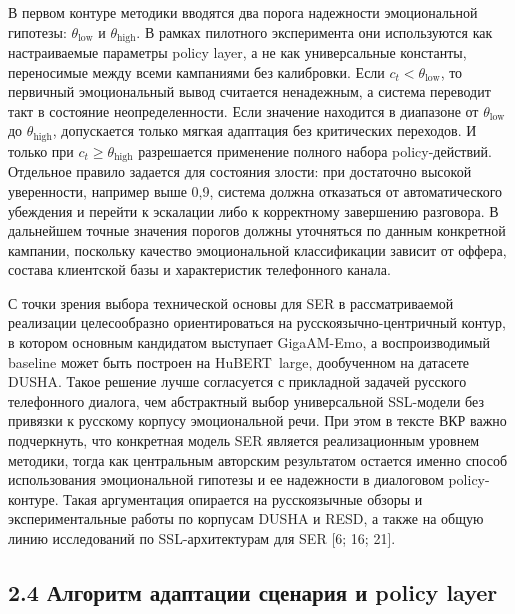 \documentclass[a4paper,14pt]{extarticle}
\renewcommand{\texttt}[1]{\textnormal{#1}}
\begin{document}
В первом контуре методики вводятся два порога надежности эмоциональной
гипотезы: \(\theta_{\mathrm{low}}\) и \(\theta_{\mathrm{high}}\). В
рамках пилотного эксперимента они используются как настраиваемые
параметры policy layer, а не как универсальные константы, переносимые
между всеми кампаниями без калибровки. Если
\(c_t < \theta_{\mathrm{low}}\), то первичный эмоциональный вывод
считается ненадежным, а система переводит такт в состояние
неопределенности. Если значение находится в диапазоне от
\(\theta_{\mathrm{low}}\) до \(\theta_{\mathrm{high}}\), допускается
только мягкая адаптация без критических переходов. И только при
\(c_t \ge \theta_{\mathrm{high}}\) разрешается применение полного набора
policy-действий. Отдельное правило задается для состояния злости: при
достаточно высокой уверенности, например выше 0,9, система должна
отказаться от автоматического убеждения и перейти к эскалации либо к
корректному завершению разговора. В дальнейшем точные значения порогов
должны уточняться по данным конкретной кампании, поскольку качество
эмоциональной классификации зависит от оффера, состава клиентской базы и
характеристик телефонного канала.

С точки зрения выбора технической основы для \texttt{SER} в
рассматриваемой реализации целесообразно ориентироваться на
русскоязычно-центричный контур, в котором основным кандидатом выступает
\texttt{GigaAM-Emo}, а воспроизводимый baseline может быть построен на
\texttt{HuBERT\ large}, дообученном на датасете \texttt{DUSHA}. Такое
решение лучше согласуется с прикладной задачей русского телефонного
диалога, чем абстрактный выбор универсальной SSL-модели без привязки к
русскому корпусу эмоциональной речи. При этом в тексте ВКР важно
подчеркнуть, что конкретная модель \texttt{SER} является реализационным
уровнем методики, тогда как центральным авторским результатом остается
именно способ использования эмоциональной гипотезы и ее надежности в
диалоговом policy-контуре. Такая аргументация опирается на русскоязычные
обзоры и экспериментальные работы по корпусам \texttt{DUSHA} и
\texttt{RESD}, а также на общую линию исследований по SSL-архитектурам
для SER {[}6; 16; 21{]}.

\subsection{2.4 Алгоритм адаптации сценария и policy
layer}\label{ux430ux43bux433ux43eux440ux438ux442ux43c-ux430ux434ux430ux43fux442ux430ux446ux438ux438-ux441ux446ux435ux43dux430ux440ux438ux44f-ux438-policy-layer}
\end{document}
